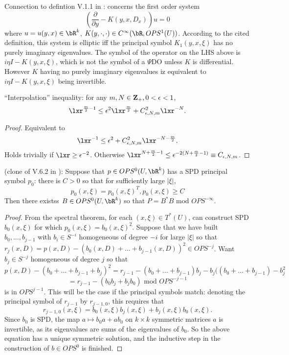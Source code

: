 Connection to defintion V.1.1 in \cite{Tay:81}: concerns the first order system
\[
  (\frac{\partial}{\partial y} - K(y,x,D_x))u = 0
\]
where $u=u(y,x) \in \bR^k$, $K(y,\cdot,\cdot) \in C^{\infty}(\bR,OPS^1(U))$. According to the cited definition, this system is elliptic iff the principal symbol $K_1(y,x,\xi)$ has no purely imaginary eigenvalues. The symbol of the operator on the LHS above is $i\eta I - K(y,x,\xi)$, which is not the symbol of a $\Psi$DO unless $K$ is differential. However $K$ having no purely imaginary eigenvalues iz equivalent to  $i\eta I - K(y,x,\xi)$ being invertible.


\begin{lemma} \label{thm:lema1}
``Interpolation'' inequality: for any $m, N \in {\bf Z}_+, 0 < \epsilon < 1$,
\[
  \lxr^{\frac{m}{2}-1} \le \epsilon^2 \lxr^{\frac{m}{2}} + C^2_{\epsilon,N,m}\lxr^{-N}. 
\]
\end{lemma}

\begin{proof}
 Equivalent to
\[
  \lxr^{-1} \le \epsilon^2 + C^2_{\epsilon,N,m}\lxr^{-N-\frac{m}{2}}. 
\]
Holds trivially if $\lxr \ge \epsilon^{-2}$. Otherwise $\lxr^{N+\frac{m}{2}-1} \le \epsilon^{-2(N+\frac{m}{2}-1)} \equiv C_{\epsilon,N,m}$.
\end{proof}

\begin{proposition}
\label{thm:propa1}(clone of V.6.2 in \cite{Tay:81}): Suppose that $p \in OPS^0(U,\bR^k)$ has a SPD principal symbol $p_0$: there is $C > 0$ so that for sufficiently large $|\xi|$,
  \[
    p_0(x,\xi) = p_0(x,\xi)^T, p_0(x,\xi) \ge C
  \]
  Then there existss $B \in OPS^0(U,\bR^k)$ so that $P = B^*B \mbox{ mod } OPS^{-\infty}$.
\end{proposition}

\begin{proof}
  From the spectral theorem, for each $(x,\xi) \in T^*(U)$, can construct SPD $b_0(x,\xi)$ for which $p_0(x,\xi) = b_0(x,\xi)^2$. Suppose that we have built $b_0,...,b_{j-1}$ with $b_i \in S^{-i}$ homogeneous of degree $-i$ for large $|\xi|$ so that
  $r_{j}(x,D) = p(x,D) - (b_0(x,D) +...+ b_{j-1}(x,D))^2 \in OPS^{-j}$. Want $b_j \in S^{-j}$ homogeneous of degree $j$ so that
  \[
    p(x,D)-(b_0 +...+ b_{j-1}+b_j)^2 = r_{j-1} -  (b_0 +...+ b_{j-1})b_j - b_j((b_0 +...+ b_{j-1}) - b_j^2
  \]
  \[
    = r_{j-1} - (b_0 b_j+b_j b_0) \mbox{ mod } OPS^{-j-1}
  \]
  is in $OPS^{j-1}$. This will be the case if the principal symbols match: denoting the principal symbol of $r_{j-1}$ by $r_{j-1,0}$, this requires that
  \[
    r_{j-1,0}(x,\xi) = b_0(x,\xi)b_j(x,\xi) + b_j(x,\xi)b_0(x,\xi).
  \]
  Since $b_0$ is SPD, the map $a \mapsto b_0a+ab_0$ on $k \times k$ symmetric matrices $a$ is invertible, as its eigenvalues are sums of the eigenvalues of $b_0$. So the above equation has a unique symmetric solution, and the inductive step in the construction of $b \in OPS^0$ is finished.
\end{proof}
  
